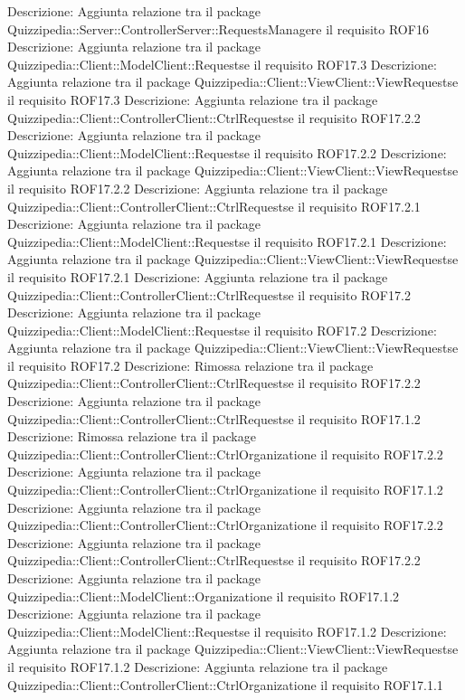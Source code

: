 Descrizione: Aggiunta relazione tra il package Quizzipedia::Server::ControllerServer::RequestsManagere il requisito ROF16 
Descrizione: Aggiunta relazione tra il package Quizzipedia::Client::ModelClient::Requestse il requisito ROF17.3 
Descrizione: Aggiunta relazione tra il package Quizzipedia::Client::ViewClient::ViewRequestse il requisito ROF17.3 
Descrizione: Aggiunta relazione tra il package Quizzipedia::Client::ControllerClient::CtrlRequestse il requisito ROF17.2.2 
Descrizione: Aggiunta relazione tra il package Quizzipedia::Client::ModelClient::Requestse il requisito ROF17.2.2 
Descrizione: Aggiunta relazione tra il package Quizzipedia::Client::ViewClient::ViewRequestse il requisito ROF17.2.2 
Descrizione: Aggiunta relazione tra il package Quizzipedia::Client::ControllerClient::CtrlRequestse il requisito ROF17.2.1 
Descrizione: Aggiunta relazione tra il package Quizzipedia::Client::ModelClient::Requestse il requisito ROF17.2.1 
Descrizione: Aggiunta relazione tra il package Quizzipedia::Client::ViewClient::ViewRequestse il requisito ROF17.2.1 
Descrizione: Aggiunta relazione tra il package Quizzipedia::Client::ControllerClient::CtrlRequestse il requisito ROF17.2 
Descrizione: Aggiunta relazione tra il package Quizzipedia::Client::ModelClient::Requestse il requisito ROF17.2 
Descrizione: Aggiunta relazione tra il package Quizzipedia::Client::ViewClient::ViewRequestse il requisito ROF17.2 
Descrizione: Rimossa relazione tra il package Quizzipedia::Client::ControllerClient::CtrlRequestse il requisito ROF17.2.2 
Descrizione: Aggiunta relazione tra il package Quizzipedia::Client::ControllerClient::CtrlRequestse il requisito ROF17.1.2 
Descrizione: Rimossa relazione tra il package Quizzipedia::Client::ControllerClient::CtrlOrganizatione il requisito ROF17.2.2 
Descrizione: Aggiunta relazione tra il package Quizzipedia::Client::ControllerClient::CtrlOrganizatione il requisito ROF17.1.2 
Descrizione: Aggiunta relazione tra il package Quizzipedia::Client::ControllerClient::CtrlOrganizatione il requisito ROF17.2.2 
Descrizione: Aggiunta relazione tra il package Quizzipedia::Client::ControllerClient::CtrlRequestse il requisito ROF17.2.2 
Descrizione: Aggiunta relazione tra il package Quizzipedia::Client::ModelClient::Organizatione il requisito ROF17.1.2 
Descrizione: Aggiunta relazione tra il package Quizzipedia::Client::ModelClient::Requestse il requisito ROF17.1.2 
Descrizione: Aggiunta relazione tra il package Quizzipedia::Client::ViewClient::ViewRequestse il requisito ROF17.1.2 
Descrizione: Aggiunta relazione tra il package Quizzipedia::Client::ControllerClient::CtrlOrganizatione il requisito ROF17.1.1 
